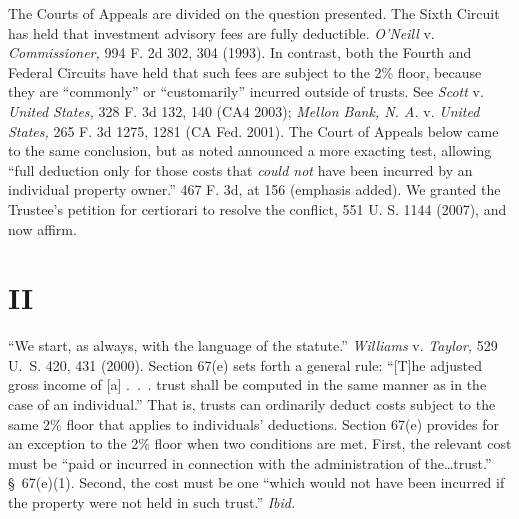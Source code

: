   The Courts of Appeals are divided on the question presented. The Sixth Circuit has held that investment advisory fees are fully deductible. \emph{O'Neill} v. \emph{Commissioner,} 994 F. 2d 302, 304 (1993). In contrast, both the Fourth and Federal Circuits have held that such fees are subject to the 2\% floor, because they are ``commonly'' or ``customarily'' incurred outside of trusts. See \emph{Scott} v. \emph{United States,} 328 F. 3d 132, 140 (CA4 2003); \emph{Mellon Bank, N. A.} v. \emph{United States,} 265 F. 3d 1275, 1281 (CA Fed. 2001). The Court of Appeals below came to the same conclusion, but as noted announced a more exacting test, allowing ``full deduction only for those costs that \emph{could not} have been incurred by an individual property owner.'' 467 F. 3d, at 156 (emphasis added). We granted the Trustee's petition for certiorari to resolve the conflict, 551 U. S. 1144 (2007), and now affirm.

\section{II}

  ``We start, as always, with the language of the statute.'' \emph{Williams} v. \emph{Taylor,} 529 U.~S. 420, 431 (2000). Section 67(e) sets forth a general rule: ``[T]he adjusted gross income of [a] .~.~. trust shall be computed in the same manner as in the case of an individual.'' That is, trusts can ordinarily deduct costs subject to the same 2\% floor that applies to individuals' deductions. Section 67(e) provides for an exception to the 2\% floor when two conditions are met. First, the relevant cost must be ``paid or incurred in connection with the administration of the\dots trust.'' \S~67(e)(1). Second, the cost must be one ``which would not have been incurred if the property were not held in such trust.'' \emph{Ibid.}

